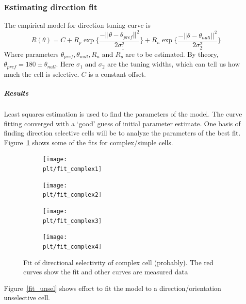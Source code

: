 \documentclass[11pt]{article}
\newcommand{\plt}{../../plots}
\begin{document}
\subsubsection{Estimating direction fit} %
\label{ssub:estimating_direction_fit}
The empirical model for direction tuning curve is
$$R(\theta) = C + R_p \exp\{\frac{-||\theta-\theta_{pref}||^2}{2\sigma_1^2}\} + R_n \exp\{\frac{-||\theta-\theta_{null}||^2}{2\sigma_2^2}\}$$
Where parameters $\theta_{pref}, \theta_{null}, R_n$ and $R_p$ are to be estimated. By theory, $\theta_{pref} = 180 \pm \theta_{null}$. Here $\sigma_1$ and $\sigma_2$ are the tuning widths, which can tell us how much the cell is selective. $C$ is a constant offset.
\subparagraph{Results} %
\label{subp:results}
Least squares estimation is used to find the parameters of the model. The curve fitting converged with a `good' guess of initial parameter estimate. One basis of finding direction selective cells will be to analyze the parameters of the best fit. Figure~\ref{fit_complex} shows some of the fits for complex/simple cells.
\begin{figure}
    \centering
    \begin{subfigure}{.48\textwidth}
        \centering
        \texttt{[image: \\plt/fit\_complex1]}
    \end{subfigure}
    \begin{subfigure}{.48\textwidth}
        \centering
        \texttt{[image: \\plt/fit\_complex2]}
    \end{subfigure}
    \newline
    \begin{subfigure}{.48\textwidth}
        \centering
        \texttt{[image: \\plt/fit\_complex3]}
    \end{subfigure}
    \begin{subfigure}{.48\textwidth}
        \centering
        \texttt{[image: \\plt/fit\_complex4]}
    \end{subfigure}
    \caption{Fit of directional selectivity of complex cell (probably). The red curves show the fit and other curves are measured data}
    \label{fit_complex}
\end{figure}
Figure~\ref{fit_unsel} shows effort to fit the model to a direction/orientation unselective cell.
\end{document}
